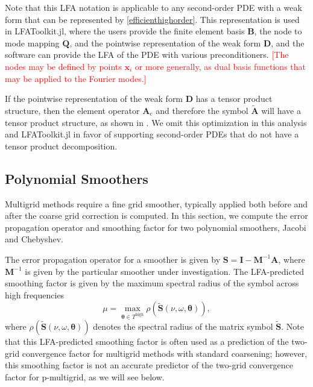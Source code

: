 \documentclass[review]{siamart190516}
\newcommand{\todo}[1]{\textcolor{red}{[#1]}}
\begin{document}
Note that this LFA notation is applicable to any second-order PDE with a weak form that can be represented by \cref{efficienthighorder}.
This representation is used in LFAToolkit.jl, where the users provide the finite element basis $\mathbf{B}$, the node to mode mapping $\mathbf{Q}$, and the pointwise representation of the weak form $\mathbf{D}$, and the software can provide the LFA of the PDE with various preconditioners.
\todo{The nodes may be defined by points $\mathbf x_i$ or more generally, as dual basis functions that may be applied to the Fourier modes.}

If the pointwise representation of the weak form $\mathbf{D}$ has a tensor product structure, then the element operator $\mathbf{A}_e$ and therefore the symbol $\tilde{\mathbf{A}}$ will have a tensor product structure, as shown in \cite{he2020two}.
We omit this optimization in this analysis and LFAToolkit.jl in favor of supporting second-order PDEs that do not have a tensor product decomposition.

\subsection{Polynomial Smoothers}\label{sec:smooth}

Multigrid methods require a fine grid smoother, typically applied both before and after the coarse grid correction is computed.
In this section, we compute the error propagation operator and smoothing factor for two polynomial smoothers, Jacobi and Chebyshev.

The error propagation operator for a smoother is given by $\mathbf{S} = \mathbf{I} - \mathbf{M}^{-1} \mathbf{A}$, where $\mathbf{M}^{-1}$ is given by the particular smoother under investigation.
The LFA-predicted smoothing factor is given by the maximum spectral radius of the symbol across high frequencies
\begin{equation}
\mu = \max_{\boldsymbol{\theta} \in T^{\text{high}}} \rho \left( \tilde{\mathbf{S}} \left( \nu, \omega, \boldsymbol{\theta} \right) \right),
\end{equation}
where $ \rho \left( \tilde{\mathbf{S}} \left( \nu, \omega, \boldsymbol{\theta} \right)\right)$ denotes the spectral radius of the matrix symbol $\tilde{\mathbf{S}}$.
Note that this LFA-predicted smoothing factor is often used as a prediction of the two-grid convergence factor for multigrid methods with standard coarsening; however, this smoothing factor is not an accurate predictor of the two-grid convergence factor for p-multigrid, as we will see below.
\end{document}
